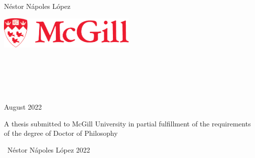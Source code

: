 \begin{titlepage}
\begin{center}

    \huge
    \textbf{}

    \vspace{1cm}

    \LARGE N\'estor N\'apoles L\'opez

    \vspace{1cm}

    \includegraphics[width=0.5\textwidth]{frontmatter/figures/mcgill}

    \vspace{0.5cm}

    \large
     \\
     \\
     \\
     \\

    \vfill

    August 2022

    \vspace{2cm}

    A thesis submitted to McGill University in partial
    fulfillment of the requirements of the degree of Doctor
    of Philosophy

    \vspace{1cm}

    \textcopyright \ N\'estor N\'apoles L\'opez 2022

\end{center}
\end{titlepage}
